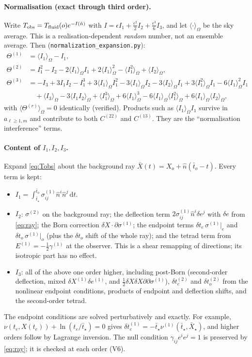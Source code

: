 \documentclass[11pt]{article}
\theoremstyle{definition}
\theoremstyle{remark}
\newcommand{\eps}{\epsilon}
\newcommand{\nhat}{\hat n}
\newcommand{\dd}{\mathrm{d}}
\newcommand{\sky}[1]{\langle #1\rangle_{\Omega}}
\begin{document}
\paragraph{Normalisation (exact through third order).} Write
$T_{\rm obs}=T_{\rm fluid}(o)e^{-I(\nhat)}$ with
$I=\eps I_1+\tfrac{\eps^2}2I_2+\tfrac{\eps^3}6I_3$, and let $\sky{\cdot}$ be
the sky average. This is a realisation-dependent \emph{random} number, not an
ensemble average. Then (\texttt{normalization\_expansion.py}):
\begin{align*}
\Theta^{(1)}&=\sky{I_1}-I_1,\\
\Theta^{(2)}&=I_1^2-I_2-2\sky{I_1}I_1+2\sky{I_1}^2-\sky{I_1^2}+\sky{I_2},\\
\Theta^{(3)}&=-I_3+3I_1I_2-I_1^3+3\sky{I_1}I_1^2-3\sky{I_1}I_2-3\sky{I_2}I_1+3\sky{I_1^2}I_1
-6\sky{I_1}^2I_1\\&\quad+\sky{I_3}-3\sky{I_1I_2}+\sky{I_1^3}+6\sky{I_1}^3-6\sky{I_1}\sky{I_1^2}+6\sky{I_1}\sky{I_2},
\end{align*}
with $\sky{\Theta^{(r)}}=0$ identically (verified). Products such as
$\sky{I_1}I_1$ survive in $a_{\ell\ge1,m}$ and contribute to both
$C^{(22)}$ and $C^{(13)}$. They are the ``normalisation interference''
terms.

\paragraph{Content of $I_1,I_2,I_3$.} Expand \eqref{eq:Tobs} about the
background ray $\bar X(t)=X_o+\nhat(\bar t_o-t)$. Every term is kept:
\begin{itemize}
\item $I_1=\int_{\bar t_\star}^{\bar t_o}\sigma^{(1)}_{ij}\nhat^i\nhat^j\,\dd t$.
\item $I_2$: $\sigma^{(2)}$ on the background ray; the deflection term
$2\sigma^{(1)}_{ij}\nhat^i\delta e^j$ with $\delta e$ from \eqref{eq:ray}; the
Born correction $\delta X\cdot\partial\sigma^{(1)}$; the endpoint terms
$\delta t_e\,\sigma^{(1)}|_e$ and $\delta t_o\,\sigma^{(1)}|_o$ (plus the
$\delta t_o$ shift of the whole ray); and the tetrad term from
$E^{(1)}=-\tfrac12\gamma^{(1)}$ at the observer. This is a shear remapping of
directions; its isotropic part has no effect.
\item $I_3$: all of the above one order higher, including post-Born
(second-order deflection, mixed $\delta X^{(1)}\delta e^{(1)}$, and
$\tfrac12\delta X\delta X\partial\partial\sigma^{(1)}$), $\delta t_e^{(2)}$
and $\delta t_o^{(2)}$ from the nonlinear endpoint conditions, products of
endpoint and deflection shifts, and the second-order tetrad.
\end{itemize}
The endpoint conditions are solved perturbatively and exactly. For example,
$\nu(t_e,X(t_e))+\ln(t_e/\bar t_\star)=0$ gives
$\delta t_e^{(1)}=-\bar t_\star\nu^{(1)}(\bar t_\star,\bar X_\star)$, and
higher orders follow by Lagrange inversion. The null condition
$\gamma_{ij}e^ie^j=1$ is preserved by \eqref{eq:ray}; it is checked at each
order (V6).
\end{document}
